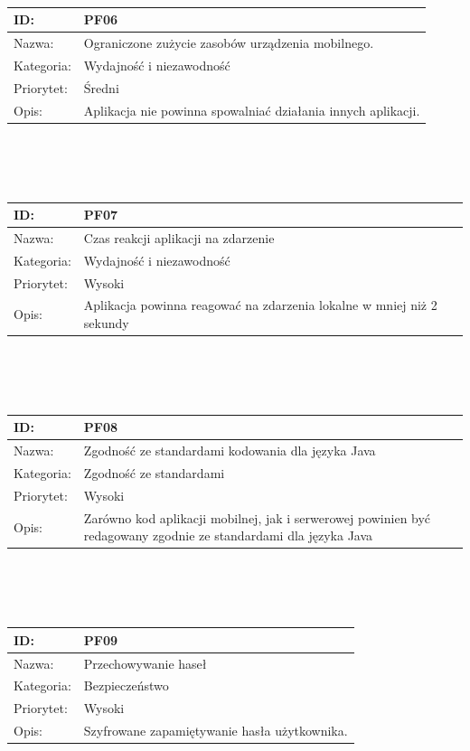 \documentclass[11pt,a4paper,polish,thesis]{dcsbook}
\begin{document}
\begin{tabular}{|p{2cm}|p{12cm}|}
\\ \hline \end{tabular} \\\\\ \begin{tabular}{|p{2cm}|p{12cm}|}  \hline ID: &
PF06
\\ \hline Nazwa: &
Ograniczone zużycie zasobów urządzenia mobilnego.
\\ \hline Kategoria: &
Wydajność i niezawodność
\\ \hline Priorytet: &
Średni
\\ \hline Opis: &
Aplikacja nie powinna spowalniać działania innych aplikacji.

\\ \hline \end{tabular} \\\\\ \begin{tabular}{|p{2cm}|p{12cm}|}  \hline ID: &
PF07
\\ \hline Nazwa: &
Czas reakcji aplikacji na zdarzenie
\\ \hline Kategoria: &
Wydajność i niezawodność
\\ \hline Priorytet: &
Wysoki
\\ \hline Opis: &
Aplikacja powinna reagować na zdarzenia lokalne w mniej niż 2 sekundy

\\ \hline \end{tabular} \\\\\ \begin{tabular}{|p{2cm}|p{12cm}|}  \hline ID: &
PF08
\\ \hline Nazwa: &
Zgodność ze standardami kodowania dla języka Java
\\ \hline Kategoria: &
Zgodność ze standardami
\\ \hline Priorytet: &
Wysoki
\\ \hline Opis: &
Zarówno kod aplikacji mobilnej, jak i serwerowej powinien być redagowany zgodnie ze standardami dla języka Java

\\ \hline \end{tabular} \\\\\ \begin{tabular}{|p{2cm}|p{12cm}|}  \hline ID: &
PF09
\\ \hline Nazwa: &
Przechowywanie haseł
\\ \hline Kategoria: &
Bezpieczeństwo
\\ \hline Priorytet: &
Wysoki
\\ \hline Opis: &
Szyfrowane zapamiętywanie hasła użytkownika.


\end{tabular}
\end{document}
